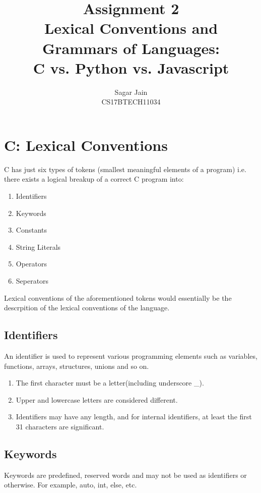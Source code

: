 \documentclass[12pt]{article}
\begin{document}
\title{\textbf{Assignment 2}\\Lexical Conventions and Grammars of Languages:\\C vs. Python vs. Javascript}
\author{Sagar Jain\\CS17BTECH11034}
\maketitle
\begin{normalsize}
\tableofcontents
\end{normalsize}
\newpage
\section{C: Lexical Conventions}
C has just six types of tokens (smallest meaningful elements of a program) i.e. there exists a logical breakup of a correct C program into:
\begin{enumerate}
\item Identifiers
\item Keywords
\item Constants
\item String Literals
\item Operators
\item Seperators
\end{enumerate}
Lexical conventions of the aforementioned tokens would essentially be the descrpition of the lexical conventions of the language.
\subsection{Identifiers}
An identifier is used to represent various programming elements such as variables, functions, arrays, structures, unions and so on.
\begin{enumerate}
\item The first character must be a letter(including underscore \_).
\item Upper and lowercase letters are considered different.
\item  Identifiers may have any length, and for internal identifiers, at least the first 31 characters are significant.
\end{enumerate}
\subsection{Keywords}
Keywords are predefined, reserved words and may not be used as identifiers or otherwise. For example, auto, int, else, etc.
\end{document}
